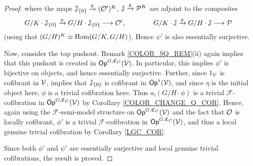 \documentclass[a4paper,10pt
,draft
]{article}%
\renewcommand{\F}{\mathcal F}
\newcommand{\J}{\mathbb J}
\renewcommand{\1}{\eta}%
\begin{document}
\begin{proof}
      where the maps $\J_{\set{0}} \xrightarrow{g} (\O')^K$, $\J \xrightarrow{g} \P^K$ are adjoint to the composites
      \begin{equation}
            G/K \cdot \J_{\set{0}} \xrightarrow{g} G/H \cdot \J_{\set{0}} \longto \O',
            \qquad \qquad
            G/K \cdot \J \xrightarrow{g} G/H \cdot \J \longto \P
      \end{equation}
      (using that $(G/H)^K \simeq \operatorname{Hom}(G/K, G/H)$).
      Hence $\psi'$ is also essentially surjective.

      Now, consider the top pushout. Remark \ref{COLOR_SQ_REM}(ii) again implies that this pushout is created in $\mathsf{Op}^{G, \mathfrak C_{\mathcal{O}}}(\mathcal V)$.
      In particular, this implies $\phi'$ is bijective on objects, and hence essentially surjective.
      Further, since $1_{\mathcal V}$ is cofibrant in $\mathcal V$, \cite[Thm. 1.15]{BM13} implies that $\J_{\set 0}$ is cofibrant in $\Op^{\**}(\V)$,
      and since $\1$ is the initial object here, $\phi$ is a trivial cofibration here.
      Thus $a_! (G/H \cdot \phi)$ is a trivial $\F$-cofibration in $\mathsf{Op}^{G, \mathfrak C_{\mathcal{O}}}(\mathcal V)$ by Corollary \ref{COLOR_CHANGE_Q_COR}.
      Hence, again using the $\F$-semi-model structure on $\mathsf{Op}^{G, \mathfrak C_{\mathcal{O}}}(\mathcal V)$ and the fact that $\mathcal{O}$ is locally cofibrant,
      $\phi'$ is a trivial $\F$-cofibration in $\mathsf{Op}^{G,\mathfrak C_{\mathcal{O}}}(\mathcal V)$,
      and thus a local genuine trivial cofibration by Corollary \ref{LGC_COR}.
      
      Since both $\phi'$ and $\psi'$ are essentially surjective and local genuine trivial cofibrations,
      the result is proved.
\end{proof}
\end{document}
